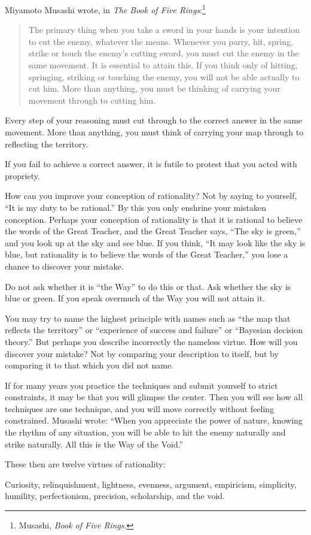 {
 Miyamoto Musashi wrote, in \textit{The Book of Five
Rings}:\footnote{Musashi, \textit{Book of Five Rings}.}}

\begin{quote}
{
 The primary thing when you take a sword in your hands is your
intention to cut the enemy, whatever the means. Whenever you parry,
hit, spring, strike or touch the enemy's cutting sword,
you must cut the enemy in the same movement. It is essential to attain
this. If you think only of hitting, springing, striking or touching the
enemy, you will not be able actually to cut him. More than anything,
you must be thinking of carrying your movement through to cutting him.}
\end{quote}

{
 Every step of your reasoning must cut through to the correct
answer in the same movement. More than anything, you must think of
carrying your map through to reflecting the territory.}

{
 If you fail to achieve a correct answer, it is futile to protest
that you acted with propriety.}

{
 How can you improve your conception of rationality? Not by saying
to yourself, ``It is my duty to be
rational.'' By this you only enshrine your mistaken
conception. Perhaps your conception of rationality is that it is
rational to believe the words of the Great Teacher, and the Great
Teacher says, ``The sky is green,''
and you look up at the sky and see blue. If you think,
``It may look like the sky is blue, but rationality is
to believe the words of the Great Teacher,'' you lose
a chance to discover your mistake.}

{
 Do not ask whether it is ``the
Way'' to do this or that. Ask whether the sky is blue
or green. If you speak overmuch of the Way you will not attain it.}

{
 You may try to name the highest principle with names such as
``the map that reflects the
territory'' or ``experience of
success and failure'' or ``Bayesian
decision theory.'' But perhaps you describe
incorrectly the nameless virtue. How will you discover your mistake?
Not by comparing your description to itself, but by comparing it to
that which you did not name.}

{
 If for many years you practice the techniques and submit yourself
to strict constraints, it may be that you will glimpse the center. Then
you will see how all techniques are one technique, and you will move
correctly without feeling constrained. Musashi wrote:
``When you appreciate the power of nature, knowing the
rhythm of any situation, you will be able to hit the enemy naturally
and strike naturally. All this is the Way of the
Void.''}

{
 These then are twelve virtues of rationality:}

{
 Curiosity, relinquishment, lightness, evenness, argument,
empiricism, simplicity, humility, perfectionism, precision,
scholarship, and the void.}

\myendsectiontext


\bigskip




